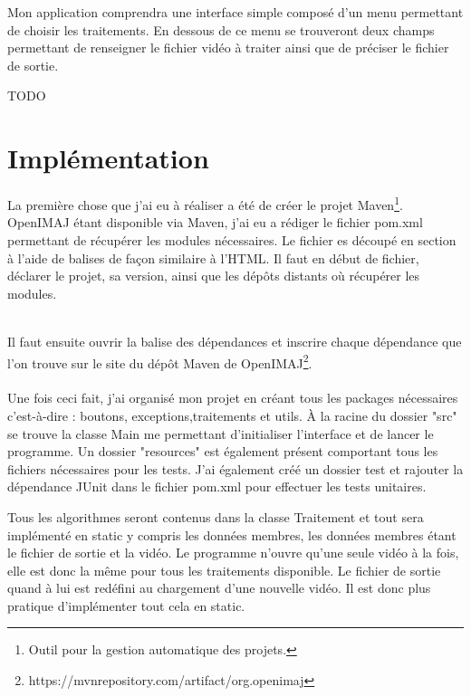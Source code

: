 \documentclass[10pt,a4paper]{article}
\begin{document}
Mon application comprendra une interface simple composé d'un menu permettant de choisir les traitements. En dessous de ce menu se trouveront deux champs permettant de renseigner le fichier vidéo à traiter ainsi que de préciser le fichier de sortie.

TODO

\section{Implémentation}

La première chose que j'ai eu à réaliser a été de créer le projet Maven\footnote{Outil pour la gestion automatique des projets.}. OpenIMAJ étant disponible via Maven,
j'ai eu a rédiger le fichier pom.xml permettant de récupérer les modules nécessaires. Le fichier es découpé en section à l'aide de balises de façon similaire à l'HTML. Il faut en début de fichier,
déclarer le projet, sa version, ainsi que les dépôts distants où récupérer les modules. \newpage



~~\\
Il faut ensuite ouvrir la balise des dépendances et inscrire chaque dépendance que l'on trouve sur le site du dépôt Maven de OpenIMAJ\footnote{https://mvnrepository.com/artifact/org.openimaj}.\\


~~\\

Une fois ceci fait, j'ai organisé mon projet en créant tous les packages nécessaires c'est-à-dire : boutons, exceptions,traitements et utils.
À la racine du dossier "src" se trouve la classe Main me permettant d'initialiser l'interface et de lancer le programme. Un dossier "resources" est également présent comportant tous les fichiers
nécessaires pour les tests. J'ai également créé un dossier test et rajouter la dépendance JUnit dans le fichier pom.xml pour effectuer les tests unitaires.

Tous les algorithmes seront contenus dans la classe Traitement et tout sera implémenté en static y compris les données membres, les données membres étant le fichier de sortie et la vidéo.
Le programme n'ouvre qu'une seule vidéo à la fois, elle est donc la même pour tous les traitements disponible. Le fichier de sortie quand à lui est redéfini au chargement d'une nouvelle vidéo.
Il est donc plus pratique d'implémenter tout cela en static.
\end{document}
